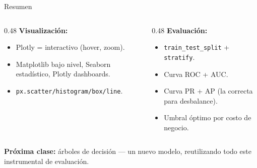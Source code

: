 \documentclass[aspectratio=169, 11pt]{beamer}
\begin{document}
\begin{frame}[shrink=8]{Resumen}
  \vspace{-4pt}
  \begin{columns}[T]
    \begin{column}{0.48\textwidth}
      {\footnotesize\bfseries\color{arcaDark} Visualización:}
      \vspace{4pt}

      {\footnotesize
      \begin{itemize}\setlength{\itemsep}{4pt}
        \item[{\color{codeGreen}\faCheckCircle}]
          Plotly = interactivo (hover, zoom).
        \item[{\color{codeGreen}\faCheckCircle}]
          Matplotlib bajo nivel, Seaborn estadístico,
          Plotly dashboards.
        \item[{\color{codeGreen}\faCheckCircle}]
          \texttt{px.scatter/histogram/box/line}.
      \end{itemize}
      }
    \end{column}

    \begin{column}{0.48\textwidth}
      {\footnotesize\bfseries\color{arcaRed} Evaluación:}
      \vspace{4pt}

      {\footnotesize
      \begin{itemize}\setlength{\itemsep}{4pt}
        \item[{\color{codeGreen}\faCheckCircle}]
          \texttt{train\_test\_split} + \texttt{stratify}.
        \item[{\color{codeGreen}\faCheckCircle}]
          Curva ROC + AUC.
        \item[{\color{codeGreen}\faCheckCircle}]
          Curva PR + AP (la correcta para desbalance).
        \item[{\color{codeGreen}\faCheckCircle}]
          Umbral óptimo por costo de negocio.
      \end{itemize}
      }
    \end{column}
  \end{columns}

  \vspace{8pt}
  \begin{tcolorbox}[colback=arcaRed!8, colframe=arcaRed, boxrule=0.5pt, arc=2pt,
    left=6pt, right=6pt, top=4pt, bottom=4pt]
    {\scriptsize\color{arcaDark}
    \faArrowRight\hspace{4pt}\textbf{Próxima clase:} árboles de decisión
    --- un nuevo modelo, reutilizando todo este instrumental de evaluación.}
  \end{tcolorbox}
\end{frame}
\end{document}
